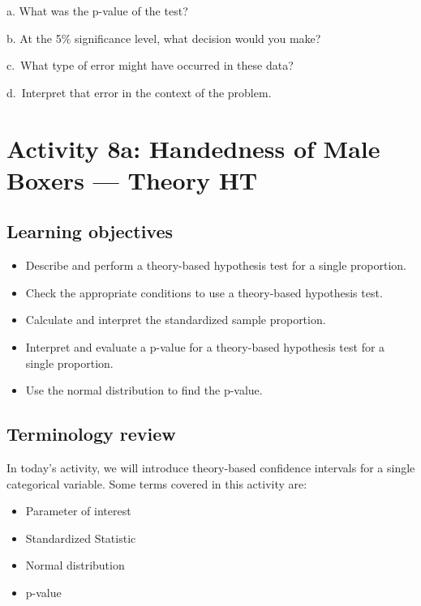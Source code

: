 \documentclass[
]{report}
\newcommand{\rgs}{\vspace{12pt}} %
\newcommand{\rgi}{\hspace{24pt}}  %
\begin{document}
\rgi a. What was the p-value of the test?
\rgs

\rgi b. At the 5\% significance level, what decision would you make?
\rgs

\rgi c.~What type of error might have occurred in these data?
\rgs

\rgi d.~Interpret that error in the context of the problem.
\rgs
\rgs

\newpage

\hypertarget{activity-8a-handedness-of-male-boxers-theory-ht}{%
\section{Activity 8a: Handedness of Male Boxers --- Theory HT}\label{activity-8a-handedness-of-male-boxers-theory-ht}}


\hypertarget{learning-objectives-9}{%
\subsection{Learning objectives}\label{learning-objectives-9}}

\begin{itemize}
\item
  Describe and perform a theory-based hypothesis test for a single proportion.
\item
  Check the appropriate conditions to use a theory-based hypothesis test.
\item
  Calculate and interpret the standardized sample proportion.
\item
  Interpret and evaluate a p-value for a theory-based hypothesis test for a single proportion.
\item
  Use the normal distribution to find the p-value.
\end{itemize}

\hypertarget{terminology-review-12}{%
\subsection{Terminology review}\label{terminology-review-12}}

In today's activity, we will introduce theory-based confidence intervals for a single categorical variable. Some terms covered in this activity are:

\begin{itemize}
\item
  Parameter of interest
\item
  Standardized Statistic
\item
  Normal distribution
\item
  p-value
\end{itemize}
\end{document}
